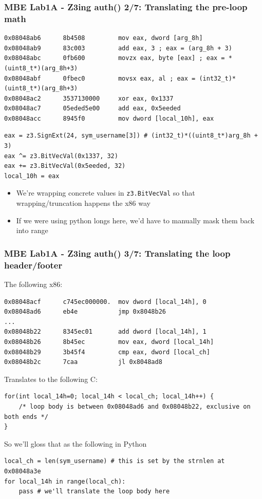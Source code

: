 \documentclass[aspectratio=169]{beamer}
\begin{document}
\begin{frame}[fragile]
\frametitle{MBE Lab1A - Z3ing auth() 2/7: Translating the pre-loop math}
\begin{Verbatim}[fontsize=\scriptsize, frame=single]
0x08048ab6      8b4508         mov eax, dword [arg_8h]
0x08048ab9      83c003         add eax, 3 ; eax = (arg_8h + 3)
0x08048abc      0fb600         movzx eax, byte [eax] ; eax = *(uint8_t*)(arg_8h+3)
0x08048abf      0fbec0         movsx eax, al ; eax = (int32_t)*(uint8_t*)(arg_8h+3)
0x08048ac2      3537130000     xor eax, 0x1337
0x08048ac7      05eded5e00     add eax, 0x5eeded
0x08048acc      8945f0         mov dword [local_10h], eax
\end{Verbatim}

\begin{Verbatim}[fontsize=\scriptsize, frame=single]
eax = z3.SignExt(24, sym_username[3]) # (int32_t)*((uint8_t*)arg_8h + 3)
eax ^= z3.BitVecVal(0x1337, 32)
eax += z3.BitVecVal(0x5eeded, 32)
local_10h = eax
\end{Verbatim}
\begin{itemize}
\item We're wrapping concrete values in \verb|z3.BitVecVal| so that wrapping/truncation happens the x86 way
\item If we were using python longs here, we'd have to manually mask them back into range
\end{itemize}
\end{frame}

\begin{frame}[fragile]
\frametitle{MBE Lab1A - Z3ing auth() 3/7: Translating the loop header/footer}
The following x86:
\begin{Verbatim}[fontsize=\scriptsize, frame=single]
0x08048acf      c745ec000000.  mov dword [local_14h], 0
0x08048ad6      eb4e           jmp 0x8048b26
...
0x08048b22      8345ec01       add dword [local_14h], 1
0x08048b26      8b45ec         mov eax, dword [local_14h]
0x08048b29      3b45f4         cmp eax, dword [local_ch]
0x08048b2c      7caa           jl 0x8048ad8
\end{Verbatim}
Translates to the following C:
\begin{Verbatim}[fontsize=\scriptsize, frame=single]
for(int local_14h=0; local_14h < local_ch; local_14h++) {
    /* loop body is between 0x08048ad6 and 0x08048b22, exclusive on both ends */
}
\end{Verbatim}
So we'll gloss that as the following in Python
\begin{Verbatim}[fontsize=\scriptsize, frame=single]
local_ch = len(sym_username) # this is set by the strnlen at 0x08048a3e
for local_14h in range(local_ch):
    pass # we'll translate the loop body here
\end{Verbatim}
\end{frame}
\end{document}
